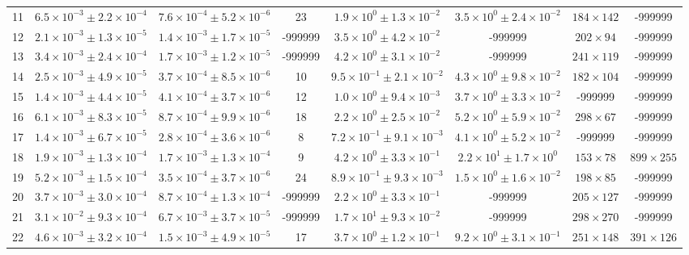 \begin{table}
\begin{tabular}{cccccccc}
11 & $6.5\times10^{-3}\pm 2.2\times10^{-4}$ & $7.6\times10^{-4}\pm 5.2\times10^{-6}$ & 23 & $1.9\times10^{0}\pm 1.3\times10^{-2}$ & $3.5\times10^{0}\pm 2.4\times10^{-2}$ & $184\times 142$ & -999999 \\
12 & $2.1\times10^{-3}\pm 1.3\times10^{-5}$ & $1.4\times10^{-3}\pm 1.7\times10^{-5}$ & -999999 & $3.5\times10^{0}\pm 4.2\times10^{-2}$ & -999999 & $202\times 94$ & -999999 \\
13 & $3.4\times10^{-3}\pm 2.4\times10^{-4}$ & $1.7\times10^{-3}\pm 1.2\times10^{-5}$ & -999999 & $4.2\times10^{0}\pm 3.1\times10^{-2}$ & -999999 & $241\times 119$ & -999999 \\
14 & $2.5\times10^{-3}\pm 4.9\times10^{-5}$ & $3.7\times10^{-4}\pm 8.5\times10^{-6}$ & 10 & $9.5\times10^{-1}\pm 2.1\times10^{-2}$ & $4.3\times10^{0}\pm 9.8\times10^{-2}$ & $182\times 104$ & -999999 \\
15 & $1.4\times10^{-3}\pm 4.4\times10^{-5}$ & $4.1\times10^{-4}\pm 3.7\times10^{-6}$ & 12 & $1.0\times10^{0}\pm 9.4\times10^{-3}$ & $3.7\times10^{0}\pm 3.3\times10^{-2}$ & -999999 & -999999 \\
16 & $6.1\times10^{-3}\pm 8.3\times10^{-5}$ & $8.7\times10^{-4}\pm 9.9\times10^{-6}$ & 18 & $2.2\times10^{0}\pm 2.5\times10^{-2}$ & $5.2\times10^{0}\pm 5.9\times10^{-2}$ & $298\times 67$ & -999999 \\
17 & $1.4\times10^{-3}\pm 6.7\times10^{-5}$ & $2.8\times10^{-4}\pm 3.6\times10^{-6}$ & 8 & $7.2\times10^{-1}\pm 9.1\times10^{-3}$ & $4.1\times10^{0}\pm 5.2\times10^{-2}$ & -999999 & -999999 \\
18 & $1.9\times10^{-3}\pm 1.3\times10^{-4}$ & $1.7\times10^{-3}\pm 1.3\times10^{-4}$ & 9 & $4.2\times10^{0}\pm 3.3\times10^{-1}$ & $2.2\times10^{1}\pm 1.7\times10^{0}$ & $153\times 78$ & $899\times 255$ \\
19 & $5.2\times10^{-3}\pm 1.5\times10^{-4}$ & $3.5\times10^{-4}\pm 3.7\times10^{-6}$ & 24 & $8.9\times10^{-1}\pm 9.3\times10^{-3}$ & $1.5\times10^{0}\pm 1.6\times10^{-2}$ & $198\times 85$ & -999999 \\
20 & $3.7\times10^{-3}\pm 3.0\times10^{-4}$ & $8.7\times10^{-4}\pm 1.3\times10^{-4}$ & -999999 & $2.2\times10^{0}\pm 3.3\times10^{-1}$ & -999999 & $205\times 127$ & -999999 \\
21 & $3.1\times10^{-2}\pm 9.3\times10^{-4}$ & $6.7\times10^{-3}\pm 3.7\times10^{-5}$ & -999999 & $1.7\times10^{1}\pm 9.3\times10^{-2}$ & -999999 & $298\times 270$ & -999999 \\
22 & $4.6\times10^{-3}\pm 3.2\times10^{-4}$ & $1.5\times10^{-3}\pm 4.9\times10^{-5}$ & 17 & $3.7\times10^{0}\pm 1.2\times10^{-1}$ & $9.2\times10^{0}\pm 3.1\times10^{-1}$ & $251\times 148$ & $391\times 126$ \\

\end{tabular}
\end{table}
